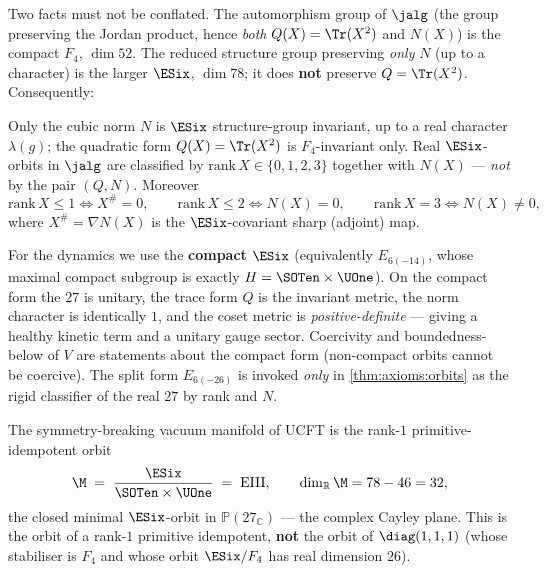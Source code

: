 Two facts must not be conflated. The automorphism group of $\jalg$ (the group
preserving the Jordan product, hence \emph{both} $Q(X)=\Tr(X^2)$ and $N(X)$)
is the compact $F_4$, $\dim 52$. The reduced structure group preserving
\emph{only} $N$ (up to a character) is the larger $\ESix$, $\dim 78$; it does
\textbf{not} preserve $Q=\Tr(X^2)$. Consequently:

\begin{theorem}\label{thm:axioms:orbits}
Only the cubic norm $N$ is $\ESix$ structure-group invariant, up to a real
character $\lambda(g)$; the quadratic form $Q(X)=\Tr(X^2)$ is
$F_4$-invariant only. Real $\ESix$-orbits in $\jalg$ are classified by
$\mathrm{rank}\,X\in\{0,1,2,3\}$ together with $N(X)$ ---
\emph{not} by the pair $(Q,N)$. Moreover
\[
  \mathrm{rank}\,X\le1\iff X^{\#}=0,\qquad
  \mathrm{rank}\,X\le2\iff N(X)=0,\qquad
  \mathrm{rank}\,X=3\iff N(X)\neq0,
\]
where $X^{\#}=\nabla N(X)$ is the $\ESix$-covariant sharp (adjoint) map.
\end{theorem}

\begin{remark}\label{rem:axioms:compact}
For the dynamics we use the \textbf{compact} $\ESix$ (equivalently
$E_{6(-14)}$, whose maximal compact subgroup is exactly
$H=\SOTen\times\UOne$). On the compact form the $27$ is unitary, the trace
form $Q$ is the invariant metric, the norm character is identically $1$, and
the coset metric is \emph{positive-definite} --- giving a healthy kinetic
term and a unitary gauge sector. Coercivity and boundedness-below of $V$ are
statements about the compact form (non-compact orbits cannot be coercive).
The split form $E_{6(-26)}$ is invoked \emph{only} in
\autoref{thm:axioms:orbits} as the rigid classifier of the real $27$ by rank
and $N$.
\end{remark}

\begin{theorem}[Vacuum manifold $=$ EIII]\label{thm:axioms:eiii}
The symmetry-breaking vacuum manifold of UCFT is the rank-$1$
primitive-idempotent orbit
\begin{equation}\label{eq:axioms:eiii}
  \M \;=\; \frac{\ESix}{\SOTen\times\UOne} \;=\; \mathrm{EIII},
  \qquad \dim_{\mathbb R}\M = 78-46 = 32,
\end{equation}
the closed minimal $\ESix$-orbit in $\mathbb P(27_{\mathbb C})$ --- the
complex Cayley plane. This is the orbit of a rank-$1$ primitive idempotent,
\textbf{not} the orbit of $\diag(1,1,1)$ (whose stabiliser is $F_4$ and whose
orbit $\ESix/F_4$ has real dimension $26$).
\end{theorem}

